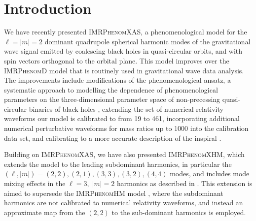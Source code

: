 \documentclass[%
aps,
prd,
amssymb,
amsmath,
amsfonts,
eqsecnum,
showpacs,
nofootinbib,
floatfix,
twocolumn,
twoside,
a4paper,
superscriptaddress
]{revtex4-1}
\newcommand{\phD}{\textsc{IMRPhenomD}\xspace}
\newcommand{\phX}{\textsc{IMRPhenomXAS}\xspace}
\newcommand{\phHM}{\textsc{IMRPhenomHM}\xspace}
\newcommand{\phXHM}{\textsc{IMRPhenomXHM}\xspace}
\begin{document}

\maketitle



\section{Introduction}
\label{sec:Introduction}

We have recently presented \phX \cite{Pratten:2020fqn},
a phenomenological model for the $\ell=\vert m\vert = 2$ dominant quadrupole spherical harmonic modes of the gravitational wave signal emitted by coalescing black holes in quasi-circular orbits, and with spin vectors orthogonal to the orbital plane. This model improves over the \phD model \cite{Husa:2015iqa,Khan:2015jqa} that is routinely used in gravitational wave data analysis. The improvements include modifications of the phenomenological ansatz, a systematic approach to modelling the dependence of phenomenological parameters on the three-dimensional parameter space of non-precessing quasi-circular binaries of black holes \cite{Jimenez-Forteza:2016oae,Keitel:2016krm}, extending the set of numerical relativity waveforms our model is calibrated to from 19 to 461, incorporating additional numerical perturbative waveforms for mass ratios up to 1000 into the calibration data set, 
and calibrating to a more accurate description of the inspiral \cite{Bohe:2016gbl}.

Building on \phX, we have also presented \phXHM \cite{Garcia-Quiros:2020qpx}, which extends the model to the leading subdominant harmonics, in particular the $(\ell, \vert m\vert) = (2,2), (2,1), (3,3), (3,2), (4,4)$ modes, and includes mode mixing effects in the $\ell=3, \; \vert m \vert = 2$ harmonics as described in \cite{Garcia-Quiros:2020qpx}.
%
This extension is aimed to supersede the \phHM model
\cite{London:2017bcn}, where the subdominant harmonics are not calibrated to numerical relativity waveforms, and instead an approximate map from the $(2,2)$ to the sub-dominant harmonics is employed.
 
\end{document}
